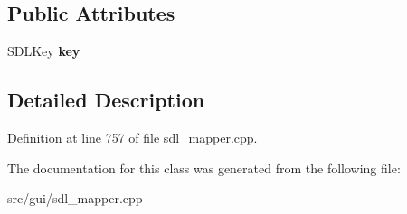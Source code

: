 \subsection*{Public Attributes}
\begin{DoxyCompactItemize}
\item 
\hypertarget{classCKeyBind_a5db2e06f00521cdcd4bdf961cb02c336}{S\-D\-L\-Key {\bfseries key}}\label{classCKeyBind_a5db2e06f00521cdcd4bdf961cb02c336}

\end{DoxyCompactItemize}


\subsection{Detailed Description}


Definition at line 757 of file sdl\-\_\-mapper.\-cpp.



The documentation for this class was generated from the following file\-:\begin{DoxyCompactItemize}
\item 
src/gui/sdl\-\_\-mapper.\-cpp\end{DoxyCompactItemize}

